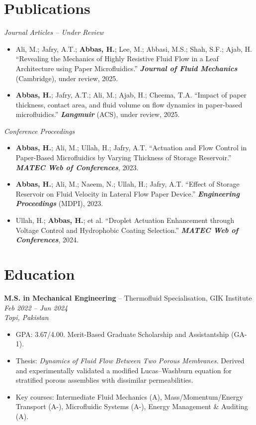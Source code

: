 \documentclass[11pt,a4paper]{article}
\begin{document}
\section{Publications}

\textit{Journal Articles -- Under Review}
\begin{itemize}
  \item Ali, M.; Jafry, A.T.; \textbf{Abbas, H.}; Lee, M.; Abbasi, M.S.; Shah,
        S.F.; Ajab, H. ``Revealing the Mechanics of Highly Resistive Fluid Flow in
        a Leaf Architecture using Paper Microfluidics.''
        \textbf{\textit{Journal of Fluid Mechanics}} (Cambridge), under review,
        2025.
  \item \textbf{Abbas, H.}; Jafry, A.T.; Ali, M.; Ajab, H.; Cheema, T.A.
        ``Impact of paper thickness, contact area, and fluid volume on flow
        dynamics in paper-based microfluidics.''
        \textbf{\textit{Langmuir}} (ACS), under review, 2025.
\end{itemize}

\vspace{4pt}
\textit{Conference Proceedings}
\begin{itemize}
  \item \textbf{Abbas, H.}; Ali, M.; Ullah, H.; Jafry, A.T. ``Actuation and Flow
        Control in Paper-Based Microfluidics by Varying Thickness of Storage
        Reservoir.'' \textbf{\textit{MATEC Web of Conferences}}, 2023.
  \item \textbf{Abbas, H.}; Ali, M.; Naeem, N.; Ullah, H.; Jafry, A.T. ``Effect
        of Storage Reservoir on Fluid Velocity in Lateral Flow Paper Device.''
        \textbf{\textit{Engineering Proceedings}} (MDPI), 2023.
  \item Ullah, H.; \textbf{Abbas, H.}; et al. ``Droplet Actuation Enhancement
        through Voltage Control and Hydrophobic Coating Selection.''
        \textbf{\textit{MATEC Web of Conferences}}, 2024.
\end{itemize}

\section{Education}

\textbf{M.S. in Mechanical Engineering} -- Thermofluid Specialisation, GIK
Institute \hfill \textit{Feb 2022 -- Jun 2024}\\
\textit{Topi, Pakistan}
\begin{itemize}
  \item GPA: 3.67/4.00. Merit-Based Graduate Scholarship and Assistantship (GA-1).
  \item Thesis: \textit{Dynamics of Fluid Flow Between Two Porous Membranes.}
        Derived and experimentally validated a modified Lucas--Washburn equation
        for stratified porous assemblies with dissimilar permeabilities.
  \item Key courses: Intermediate Fluid Mechanics (A), Mass/Momentum/Energy
        Transport (A-), Microfluidic Systems (A-), Energy Management \&
        Auditing (A).
\end{itemize}
\end{document}
